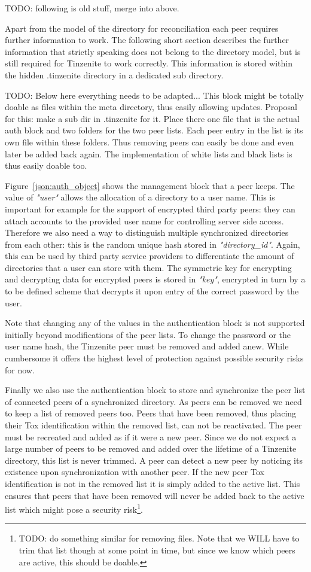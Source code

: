 TODO: following is old stuff, merge into above.

Apart from the model of the directory for reconciliation each peer requires further information to work.
The following short section describes the further information that strictly speaking does not belong to the directory model, but is still required for Tinzenite to work correctly.
This information is stored within the hidden .tinzenite directory in a dedicated sub directory.

TODO: Below here everything needs to be adapted...
This block might be totally doable as files within the meta directory, thus easily allowing updates.
Proposal for this: make a sub dir in .tinzenite for it.
Place there one file that is the actual auth block and two folders for the two peer lists.
Each peer entry in the list is its own file within these folders.
Thus removing peers can easily be done and even later be added back again.
The implementation of white lists and black lists is thus easily doable too.

Figure~\ref{json:auth_object} shows the management block that a peer keeps.
The value of \textit{"user"} allows the allocation of a directory to a user name.
This is important for example for the support of encrypted third party peers: they can attach accounts to the provided user name for controlling server side access.
Therefore we also need a way to distinguish multiple synchronized directories from each other: this is the random unique hash stored in \textit{"directory\_id"}.
Again, this can be used by third party service providers to differentiate the amount of directories that a user can store with them.
The symmetric key for encrypting and decrypting data for encrypted peers is stored in \textit{"key"}, encrypted in turn by a to be defined scheme that decrypts it upon entry of the correct password by the user.

Note that changing any of the values in the authentication block is not supported initially beyond modifications of the peer lists.
To change the password or the user name hash, the Tinzenite peer must be removed and added anew.
While cumbersome it offers the highest level of protection against possible security risks for now.

Finally we also use the authentication block to store and synchronize the peer list of connected peers of a synchronized directory.
As peers can be removed we need to keep a list of removed peers too.
Peers that have been removed, thus placing their Tox identification within the removed list, can not be reactivated.
The peer must be recreated and added as if it were a new peer.
Since we do not expect a large number of peers to be removed and added over the lifetime of a Tinzenite directory, this list is never trimmed.
A peer can detect a new peer by noticing its existence upon synchronization with another peer.
If the new peer Tox identification is not in the removed list it is simply added to the active list.
This ensures that peers that have been removed will never be added back to the active list which might pose a security risk\footnote{TODO: do something similar for removing files. Note that we WILL have to trim that list though at some point in time, but since we know which peers are active, this should be doable.}.



